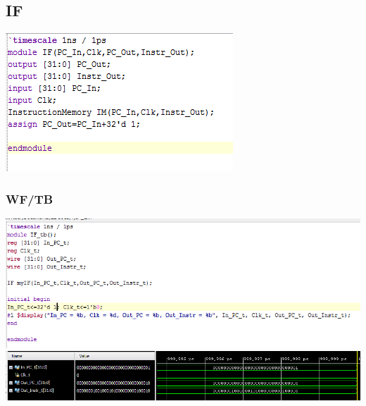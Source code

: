 \documentclass{llncs}
\begin{document}
\begin{addmargin}[-5em]{-2em}
\subsection{IF}
\label{if:1}
\begin{flushleft}
  \includegraphics[scale=.6]{../Screenshots/IF.PNG}
\end{flushleft}
\subsubsection{WF/TB}
\begin{flushleft}
\includegraphics[scale=.6]{../Screenshots/IF_tb.PNG}
\includegraphics[scale=.6]{../Screenshots/IF_Waveform.PNG}
\end{flushleft}


\end{addmargin}
\end{document}
